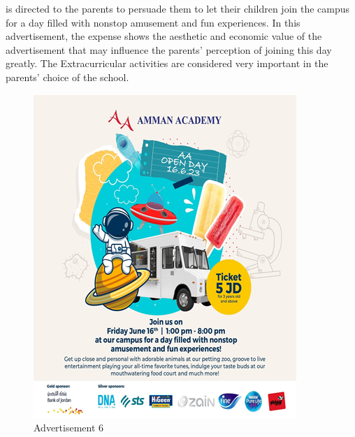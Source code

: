 \documentclass[english]{textolivre}
\begin{document}
 is directed to the parents to persuade them to let their children join the campus for a day filled with nonstop amusement and fun experiences. In this advertisement, the expense shows the aesthetic and economic value of the advertisement that may influence the parents’ perception of joining this day greatly. The Extracurricular activities are considered very important in the parents’ choice of the school.

\begin{figure}[htbp]
\centering
\begin{minipage}{0.5\textwidth}
\includegraphics[width=\linewidth]{Fig6.png}
\caption{Advertisement 6}
\label{fig6}
\end{minipage}
\end{figure}
\end{document}
